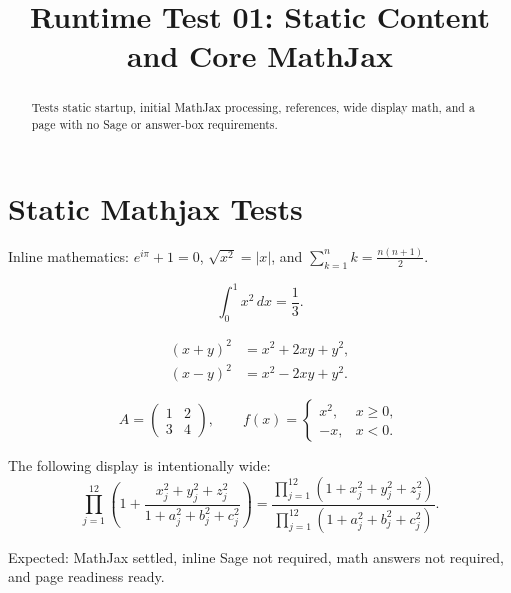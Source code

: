 \documentclass{ximera}
\title{Runtime Test 01: Static Content and Core MathJax}
\begin{document}
\begin{abstract}
Tests static startup, initial MathJax processing, references, wide display math,
and a page with no Sage or answer-box requirements.
\end{abstract}
\maketitle

\section{Static Mathjax Tests}

Inline mathematics: \(e^{i\pi}+1=0\), \(\sqrt{x^2}=|x|\), and
\(\displaystyle \sum_{k=1}^{n} k=\frac{n(n+1)}{2}\).

\[
\int_0^1 x^2\,dx=\frac13.
\]

\begin{align*}
(x+y)^2&=x^2+2xy+y^2,\\
(x-y)^2&=x^2-2xy+y^2.
\end{align*}

\[
A=\begin{pmatrix}1&2\\3&4\end{pmatrix},
\qquad
f(x)=\begin{cases}x^2,&x\ge0,\\-x,&x<0.\end{cases}
\]

The following display is intentionally wide:
\[
\prod_{j=1}^{12}
\left(1+\frac{x_j^2+y_j^2+z_j^2}{1+a_j^2+b_j^2+c_j^2}\right)
=
\frac{\displaystyle\prod_{j=1}^{12}(1+x_j^2+y_j^2+z_j^2)}
{\displaystyle\prod_{j=1}^{12}(1+a_j^2+b_j^2+c_j^2)}.
\]

Expected: MathJax settled, inline Sage not required, math answers not required,
and page readiness ready.
\end{document}

